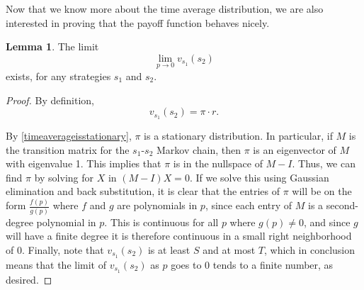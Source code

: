 \documentclass[12pt]{article}
\theoremstyle{definition}
\newtheorem{lemma}[theorem]{Lemma}
\theoremstyle{remark}
\begin{document}
Now that we know more about the time average distribution, we are also interested in proving that the payoff function behaves nicely.

\begin{lemma}
  \label{limitvexists}
  The limit \begin{equation*}
    \lim_{p \to 0} v_{s_1}(s_2)
  \end{equation*}
  exists, for any strategies $s_1$ and $s_2$.
\end{lemma}
\begin{proof}
  By definition, \begin{equation*}
    v_{s_1}(s_2) = \pi \cdot r.
  \end{equation*}

  By \cref{timeaverageisstationary}, $\pi$ is a stationary distribution. In particular, if $M$ is the transition matrix for the $s_1$-$s_2$ Markov chain, then $\pi$ is an eigenvector of $M$ with eigenvalue 1. This implies that $\pi$ is in the nullspace of $M - I$. Thus, we can find $\pi$ by solving for $X$ in $(M - I)X = 0$. If we solve this using Gaussian elimination and back substitution, it is clear that the entries of $\pi$ will be on the form $\frac{f(p)}{g(p)}$ where $f$ and $g$ are polynomials in $p$, since each 
  entry of $M$ is a second-degree polynomial in $p$. This is continuous for all $p$ where $g(p) \neq 0$, and since $g$ will have a finite degree it is therefore continuous in a small right neighborhood of 0. Finally, note that $v_{s_1}(s_2)$ is at least $S$ and at most $T$, which in conclusion means that the limit of $v_{s_1}(s_2)$ as $p$ goes to 0 tends to a finite number, as desired.
\end{proof}
\end{document}
